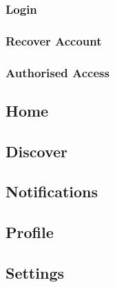\subsubsection{Login}
\subsubsection{Recover Account}
\subsubsection{Authorised Access}

\subsection{Home}
\subsection{Discover}
\subsection{Notifications}
\subsection{Profile}
\subsection{Settings}